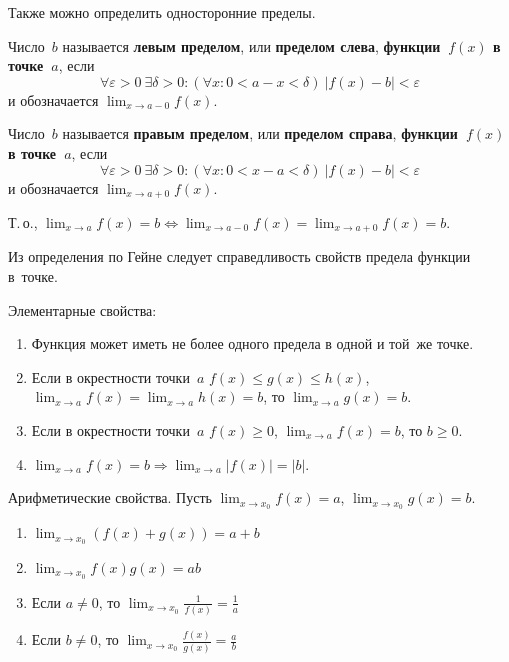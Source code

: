 Также можно определить односторонние пределы.

Число~$b$ называется \textbf{левым пределом}, или \textbf{пределом слева}, \textbf{функции~$f(x)$ в точке~$a$}, если
\begin{equation*}
\forall \varepsilon > 0 \ \exists \delta > 0 \colon (\forall x \colon 0 < a - x < \delta) \ |f(x) - b| < \varepsilon
\end{equation*}
и обозначается $\displaystyle \lim_{x \to a-0} f(x)$.

Число~$b$ называется \textbf{правым пределом}, или \textbf{пределом справа}, \textbf{функции~$f(x)$ в точке~$a$}, если
\begin{equation*}
\forall \varepsilon > 0 \ \exists \delta > 0 \colon (\forall x \colon 0 < x - a < \delta) \ |f(x) - b| < \varepsilon
\end{equation*}
и обозначается $\displaystyle \lim_{x \to a+0} f(x)$.

Т.\,о., $\displaystyle \lim_{x \to a} f(x) = b \Leftrightarrow \lim_{x \to a-0} f(x) = \lim_{x \to a+0} f(x) = b$.

Из определения по Гейне следует справедливость свойств предела функции в~точке.

Элементарные свойства:
\begin{enumerate}
	\item Функция может иметь не более одного предела в одной и той~же точке.
	\item \begin{theorem}
	\label{th:about_two_policemen}
	Если в окрестности точки~$a$ $f(x) \leqslant g(x) \leqslant h(x)$, $\displaystyle \lim_{x \to a} f(x) = \lim_{x \to a} h(x) = b$, то $\displaystyle \lim_{x \to a} g(x) = b$.
	\end{theorem}
	\item Если в окрестности точки~$a$ $f(x) \geqslant 0$, $\displaystyle \lim_{x \to a} f(x) = b$, то $b \geqslant 0$.
	\item $\displaystyle \lim_{x \to a} f(x) = b \Rightarrow \lim_{x \to a} |f(x)| = |b|$.
\end{enumerate}

Арифметические свойства.
Пусть $\displaystyle \lim_{x \to x_0} f(x) = a$, $\displaystyle \lim_{x \to x_0} g(x) = b$.
\begin{enumerate}
	\item $\displaystyle \lim_{x \to x_0} (f(x) + g(x)) = a + b$
	\item $\displaystyle \lim_{x \to x_0} f(x)g(x) = ab$
	\item Если $a \neq 0$, то $\displaystyle \lim_{x \to x_0} \frac1{f(x)} = \frac1a$
	\item Если $b \neq 0$, то $\displaystyle \lim_{x \to x_0} \frac{f(x)}{g(x)} = \frac{a}b$
\end{enumerate}